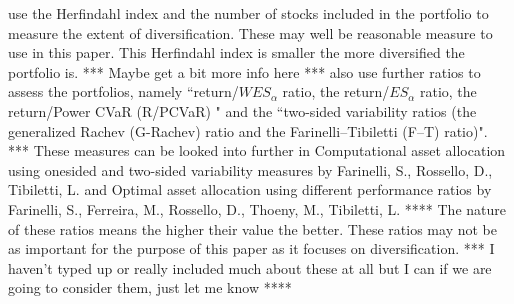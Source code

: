 \documentclass[12pt,a4paper]{article}
\begin{document}
 
\cite{CHEN20111777} use the Herfindahl index and the number of stocks included in the portfolio to measure the extent of diversification. These may well be reasonable measure to use in this paper. This Herfindahl index is smaller the more diversified the portfolio is. *** Maybe get a bit more info here *** \cite{CHEN20111777} also use further ratios to assess the portfolios, namely ``return/$WES_{\alpha}$ ratio, the return/$ES_{\alpha}$ ratio, the return/Power CVaR (R/PCVaR) " and the ``two-sided variability ratios (the generalized Rachev (G-Rachev) ratio and the Farinelli–Tibiletti (F–T) ratio)". *** These measures can be looked into further in Computational asset allocation using onesided
and two-sided variability measures by Farinelli, S., Rossello, D., Tibiletti, L. and Optimal asset allocation using different performance ratios by Farinelli, S., Ferreira, M., Rossello, D., Thoeny, M., Tibiletti, L. **** The nature of these ratios means the higher their value the better. These ratios may not be as important for the purpose of this paper as it focuses on diversification. *** I haven't typed up or really included much about these at all but I can if we are going to consider them, just let me know ****
\end{document}

